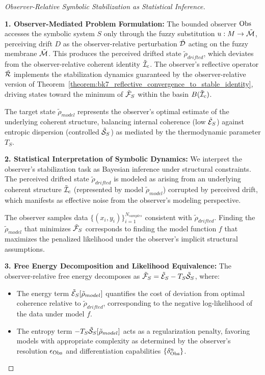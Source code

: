 \begin{proof}[Observer-Relative Symbolic Stabilization as Statistical Inference]
\label{proof:bk7_observer_relative_symbolic_stabilization_as_statistical_inference}
\leavevmode

\textbf{1. Observer-Mediated Problem Formulation:} The bounded observer $\mathrm{Obs}$ accesses the symbolic system $S$ only through the fuzzy substitution $u: M \to \tilde{\mathcal{M}}$, perceiving drift $D$ as the observer-relative perturbation $\tilde{\mathcal{D}}$ acting on the fuzzy membrane $\tilde{\mathcal{M}}$. This produces the perceived drifted state $\tilde{\rho}_{drifted}$, which deviates from the observer-relative coherent identity $\tilde{\mathcal{I}}_c$. The observer's reflective operator $\tilde{\mathcal{R}}$ implements the stabilization dynamics guaranteed by the observer-relative version of Theorem~\ref{theorem:bk7_reflective_convergence_to_stable_identity}, driving states toward the minimum of $\tilde{\mathcal{F}}_S$ within the basin $B(\tilde{\mathcal{I}}_c)$.

The target state $\tilde{\rho}_{model}$ represents the observer's optimal estimate of the underlying coherent structure, balancing internal coherence (low $\tilde{\mathcal{E}}_S$) against entropic dispersion (controlled $\tilde{\mathcal{S}}_S$) as mediated by the thermodynamic parameter $T_S$.

\textbf{2. Statistical Interpretation of Symbolic Dynamics:} We interpret the observer's stabilization task as Bayesian inference under structural constraints. The perceived drifted state $\tilde{\rho}_{drifted}$ is modeled as arising from an underlying coherent structure $\tilde{\mathcal{I}}_c$ (represented by model $\tilde{\rho}_{model}$) corrupted by perceived drift, which manifests as effective noise from the observer's modeling perspective.

The observer samples data $\{(x_i, y_i)\}_{i=1}^{N_{samples}}$ consistent with $\tilde{\rho}_{drifted}$. Finding the $\tilde{\rho}_{model}$ that minimizes $\tilde{\mathcal{F}}_S$ corresponds to finding the model function $f$ that maximizes the penalized likelihood under the observer's implicit structural assumptions.

\textbf{3. Free Energy Decomposition and Likelihood Equivalence:} The observer-relative free energy decomposes as $\tilde{\mathcal{F}}_S = \tilde{\mathcal{E}}_S - T_S \tilde{\mathcal{S}}_S$, where:
\begin{itemize}
    \item The energy term $\tilde{\mathcal{E}}_S[\tilde{\rho}_{model}]$ quantifies the cost of deviation from optimal coherence relative to $\tilde{\rho}_{drifted}$, corresponding to the negative log-likelihood of the data under model $f$.
    \item The entropy term $-T_S \tilde{\mathcal{S}}_S[\tilde{\rho}_{model}]$ acts as a regularization penalty, favoring models with appropriate complexity as determined by the observer's resolution $\epsilon_{\mathrm{Obs}}$ and differentiation capabilities $\{\delta^n_{\mathrm{Obs}}\}$.
\end{itemize}


\end{proof}
